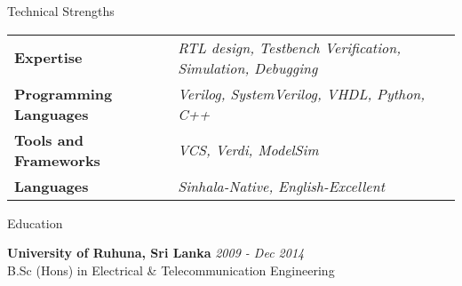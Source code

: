 \documentclass[
11pt, %
]{./assets/resume} %
\begin{document}
\begin{rSection}{Technical Strengths}
	
	\def\arraystretch{1.5}
	
	\begin{tabular}{p{2.0in} p{4.5in}}
		\textbf{Expertise} & \emph{RTL design, Testbench Verification, Simulation, Debugging} \\
		\textbf{Programming Languages} & \emph{Verilog, SystemVerilog, VHDL, Python, C++} \\
		\textbf{Tools and Frameworks} & \emph{VCS, Verdi, ModelSim} \\ 
		\textbf{Languages} & \emph{Sinhala-Native, English-Excellent} \\
	\end{tabular}
	
\end{rSection}


\begin{rSection}{Education}
	
	\textbf{University of Ruhuna, Sri Lanka} \hfill \textit{2009 - Dec 2014} \\ 
	B.Sc (Hons) in Electrical \& Telecommunication Engineering \\
	
\end{rSection}

\end{document}
